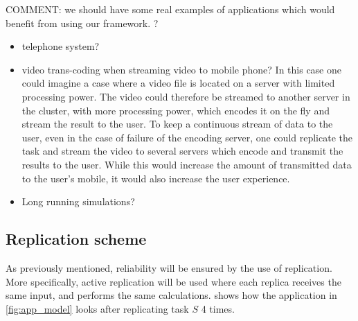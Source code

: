 \documentclass{cslthse-msc}
\begin{document}
COMMENT: we should have some real examples of applications which would benefit from using our framework. ?
\begin{itemize}
\item telephone system?
\item video trans-coding when streaming video to mobile phone? In this case one could imagine a case where a video file is located on a server with limited processing power. The video could therefore be streamed to another server in the cluster, with more processing power, which encodes it on the fly and stream the result to the user. To keep a continuous stream of data to the user, even in the case of failure of the encoding server, one could replicate the task and stream the video to several servers which encode and transmit the results to the user. While this would increase the amount of transmitted data to the user's mobile, it would also increase the user experience.
\item Long running simulations? \cite{relModelDistSimSystem}
\end{itemize}

\subsection{Replication scheme} \label{subsec:design_repl_scheme}
As previously mentioned, reliability will be ensured by the use of replication. More specifically, active replication will be used where each replica receives the same input, and performs the same calculations.  shows how the application in \cref{fig:app_model} looks after replicating task $S$ 4 times.
\end{document}
